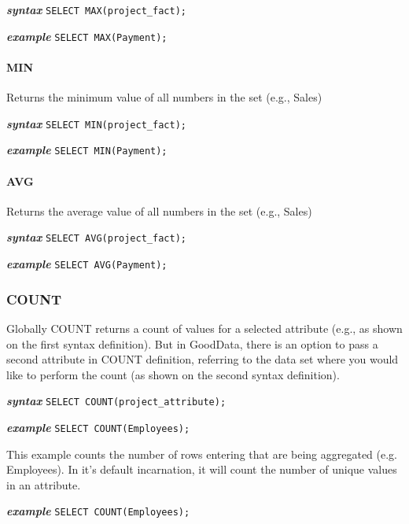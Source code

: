 \documentclass[a4paper, 12pt, titlepage, fleqn]{article}
\begin{document}
\textbf{\emph{syntax}}  \hspace{.9cm}\verb=SELECT MAX(project_fact);=

\textbf{\emph{example}}  \hspace{.6cm}\verb=SELECT MAX(Payment);=

\paragraph*{MIN} Returns the minimum value of all numbers in the set (e.g., Sales)

\textbf{\emph{syntax}}  \hspace{.9cm}\verb=SELECT MIN(project_fact);=

\textbf{\emph{example}}  \hspace{.6cm}\verb=SELECT MIN(Payment);=

\paragraph*{AVG} Returns the average value of all numbers in the set (e.g., Sales)

\textbf{\emph{syntax}}  \hspace{.9cm}\verb=SELECT AVG(project_fact);=

\textbf{\emph{example}}  \hspace{.6cm}\verb=SELECT AVG(Payment);=

\subsubsection{COUNT} 

Globally COUNT returns a count of values for a selected attribute (e.g., as shown on the first syntax definition). But in GoodData, there is an option to pass a second attribute in COUNT definition, referring to the data set where you would like to perform the count (as shown on the second syntax definition).

\textbf{\emph{syntax}}  \hspace{.9cm}\verb=SELECT COUNT(project_attribute);=

\textbf{\emph{example}}  \hspace{.6cm}\verb=SELECT COUNT(Employees);=

This example counts the number of rows entering that are being aggregated (e.g. Employees). In it's default incarnation, it will count the number of unique values in an attribute.

\textbf{\emph{example}}  \hspace{.5cm}\verb=SELECT COUNT(Employees);=
\end{document}
